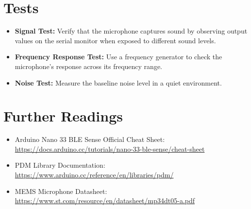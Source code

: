 \section{Tests}

\begin{itemize}
	\item \textbf{Signal Test:} Verify that the microphone captures sound by observing output values on the serial monitor when exposed to different sound levels.
	\item \textbf{Frequency Response Test:} Use a frequency generator to check the microphone's response across its frequency range.
	\item \textbf{Noise Test:} Measure the baseline noise level in a quiet environment.
\end{itemize}

\section{Further Readings}

\begin{itemize}
	\item Arduino Nano 33 BLE Sense Official Cheat Sheet: 
	\href{https://docs.arduino.cc/tutorials/nano-33-ble-sense/cheat-sheet/?_gl=1*1ulejf9*_up*MQ..*_ga*MTE0OTEyODcyMy4xNzM0NzMwOTY3*_ga_NEXN8H46L5*MTczNDczMDk2NS4xLjAuMTczNDczMDk2NS4wLjAuMTUyMDc5NTA4MQ..#board-package}{https://docs.arduino.cc/tutorials/nano-33-ble-sense/cheat-sheet}
	\item PDM Library Documentation: \url{https://www.arduino.cc/reference/en/libraries/pdm/}
	\item MEMS Microphone Datasheet: \url{https://www.st.com/resource/en/datasheet/mp34dt05-a.pdf}
\end{itemize}





